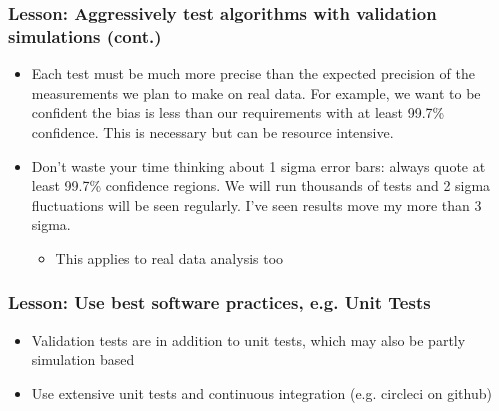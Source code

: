 \documentclass{beamer}
\begin{document}
\frame
{
    \frametitle{Lesson: Aggressively test algorithms with validation simulations (cont.)}


    \begin{itemize}


        \item Each test must be much more precise than the expected precision
            of the measurements we plan to make on real data.  For example, we
            want to be confident the bias is less than our requirements with at
            least 99.7\% confidence.  This is necessary but can be resource
            intensive.

        \item Don't waste your time thinking about 1 sigma error bars:  always
            quote at least 99.7\% confidence regions.  We will run thousands of
            tests and 2 sigma fluctuations will be seen regularly. I've
            seen results move my more than 3 sigma.

            \begin{itemize}
                \item This applies to real data analysis too
            \end{itemize}

    \end{itemize}

}



\frame
{
    \frametitle{Lesson: Use best software practices, e.g. Unit Tests}

    \begin{itemize}

        \item Validation tests are in addition to unit tests, which may also be
            partly simulation based

        \item Use extensive unit tests and continuous integration (e.g. circleci
            on github)

    \end{itemize}

}
\end{document}
